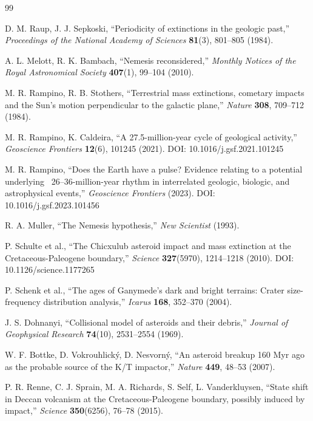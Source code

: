 \documentclass[12pt,a4paper]{article}
\begin{document}
	\begin{thebibliography}{99}
		
		D. M. Raup, J. J. Sepkoski, ``Periodicity of extinctions in the geologic past,''
		\emph{Proceedings of the National Academy of Sciences} \textbf{81}(3), 801–805 (1984).
		
		A. L. Melott, R. K. Bambach, ``Nemesis reconsidered,''
		\emph{Monthly Notices of the Royal Astronomical Society} \textbf{407}(1), 99–104 (2010).
		
		M. R. Rampino, R. B. Stothers, ``Terrestrial mass extinctions, cometary impacts and the Sun's motion perpendicular to the galactic plane,''
		\emph{Nature} \textbf{308}, 709–712 (1984).
		
		M. R. Rampino, K. Caldeira, ``A 27.5-million-year cycle of geological activity,''
		\emph{Geoscience Frontiers} \textbf{12}(6), 101245 (2021). DOI: 10.1016/j.gsf.2021.101245
		
		M. R. Rampino, ``Does the Earth have a pulse? Evidence relating to a potential underlying ~26–36-million-year rhythm in interrelated geologic, biologic, and astrophysical events,''
		\emph{Geoscience Frontiers} (2023). DOI: 10.1016/j.gsf.2023.101456
		
		R. A. Muller, ``The Nemesis hypothesis,''
		\emph{New Scientist} (1993).
		
		P. Schulte et al., ``The Chicxulub asteroid impact and mass extinction at the Cretaceous-Paleogene boundary,''
		\emph{Science} \textbf{327}(5970), 1214–1218 (2010). DOI: 10.1126/science.1177265
		
		P. Schenk et al., ``The ages of Ganymede's dark and bright terrains: Crater size-frequency distribution analysis,''
		\emph{Icarus} \textbf{168}, 352–370 (2004).
		
		J. S. Dohnanyi, ``Collisional model of asteroids and their debris,''
		\emph{Journal of Geophysical Research} \textbf{74}(10), 2531–2554 (1969).
		
		W. F. Bottke, D. Vokrouhlický, D. Nesvorný, ``An asteroid breakup 160 Myr ago as the probable source of the K/T impactor,''
		\emph{Nature} \textbf{449}, 48–53 (2007).
		
		P. R. Renne, C. J. Sprain, M. A. Richards, S. Self, L. Vanderkluysen, ``State shift in Deccan volcanism at the Cretaceous-Paleogene boundary, possibly induced by impact,''
		\emph{Science} \textbf{350}(6256), 76–78 (2015).
		

\end{thebibliography}
\end{document}
